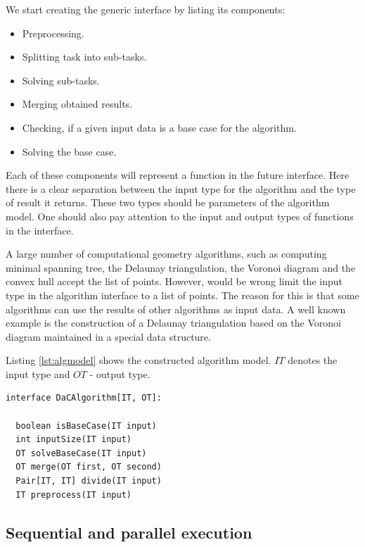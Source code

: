 \documentclass[conference]{IEEEtran}
\theoremstyle{plane}
\begin{document}
		We start creating the generic interface by listing its components:
		
		\begin{itemize}
			\item 
			Preprocessing.
			\item 
			Splitting task into sub-tasks.
			\item 
			Solving sub-tasks.
			\item 
			Merging obtained results.
			\item 
			Checking, if a given input data is a base case for the algorithm.
			\item 
			Solving the base case.
		\end{itemize}
		
		Each of these components will represent a function in the future interface. Here there is a clear separation between the input type for the algorithm and the type of result it returns. These two types should be parameters of the algorithm model. One should also pay attention to the input and output types of functions  in the interface.
		
		A large number of computational geometry algorithms, such as computing minimal spanning tree, the Delaunay triangulation, the Voronoi diagram and the convex hull accept the list of points. However, would be wrong limit the input type in the algorithm interface to a list of points. The reason for this is that some algorithms can use the results of other algorithms as input data. A well known example is the construction of a Delaunay triangulation based on the Voronoi diagram maintained in a special data structure.
		
		Listing \ref{lst:algmodel} shows the constructed algorithm model. $IT$ denotes the input type and $OT$ - output type.
		
		\begin{lstlisting}[caption={Algorithm model based on the ``divide-and-conquer'' principle},label={lst:algmodel},captionpos=b]
interface DaCAlgorithm[IT, OT]:

  boolean isBaseCase(IT input)
  int inputSize(IT input)
  OT solveBaseCase(IT input)
  OT merge(OT first, OT second)
  Pair[IT, IT] divide(IT input)
  IT preprocess(IT input)
		\end{lstlisting}
		

\subsection{Sequential and parallel execution}
\end{document}
